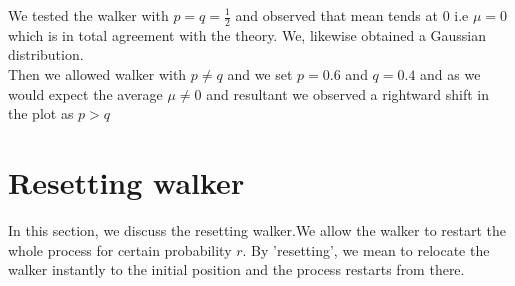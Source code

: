 \documentclass[showpacs,amsmath,amssymb,aps,pre,twocolumn]{revtex4-1}
\begin{document}

We tested the walker with $p=q= \frac{1}{2}$ and observed that mean tends at $0$ i.e $\mu = 0$ which is in total agreement with the theory. We, likewise obtained a Gaussian distribution.\\ Then we allowed walker with $p \neq q$ and we set $p =0.6$ and $q = 0.4$ and as we would expect the average $\mu \neq 0$ and resultant we observed a rightward shift in the plot as $p>q$

\section{Resetting walker}

In this section, we discuss the resetting walker.We allow the walker to restart the whole process for certain probability $r$. By 'resetting', we mean to relocate the walker instantly to the initial position and the process restarts from there.

\end{document}
